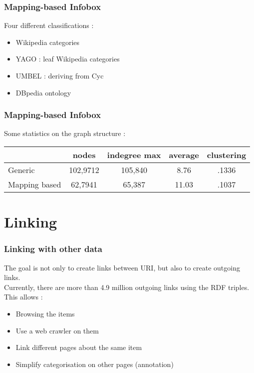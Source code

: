 \documentclass{beamer}
\begin{document}
\begin{frame}[fragile]
	\frametitle{Mapping-based Infobox}
	
	Four different classifications :
	\begin{itemize}
	\item Wikipedia categories
	\item YAGO : leaf Wikipedia categories
	\item UMBEL : deriving from Cyc
	\item DBpedia ontology
	\end{itemize}
	
\end{frame}

\begin{frame}[fragile]
	\frametitle{Mapping-based Infobox}
	
	Some statistics on the graph structure : 
	\begin{tabular}{l!{\vrule}cccc} 
	  & nodes & indegree max & average & clustering \\\hline 
	Generic  & 102,9712 & 105,840 & 8.76 & .1336 \\\hline 
	Mapping based  & 62,7941 & 65,387 & 11.03 & .1037 \\\hline 
	\end{tabular}
	
\end{frame}

\section{Linking}
\begin{frame}[fragile]
	\frametitle{Linking with other data}
	
	The goal is not only to create links between URI, but also to create outgoing links. 
	\\Currently, there are more than 4.9 million outgoing links using the RDF triples.
	\\This allows : 
	\begin{itemize}
	\item Browsing the items
	\item Use a web crawler on them
	\item Link different pages about the same item
	\item Simplify categorisation on other pages (annotation)
	\end{itemize}
	
\end{frame}
\end{document}
